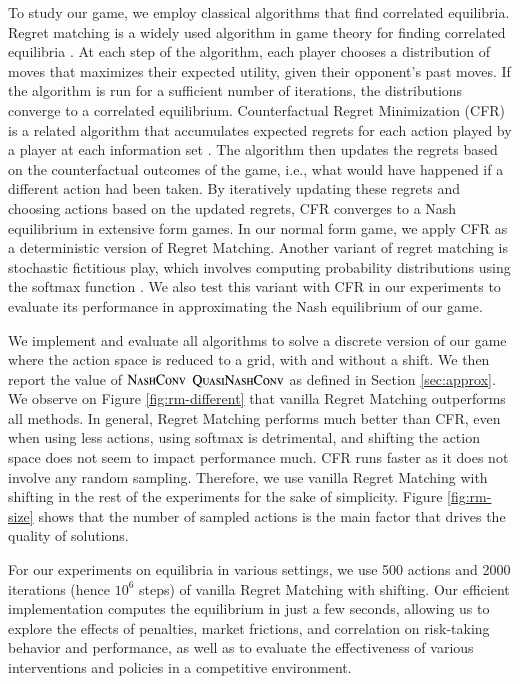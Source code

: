\documentclass[preprint,12pt,authoryear]{elsarticle}
\theoremstyle{definition}
\begin{document}
To study our game, we employ classical algorithms that find correlated equilibria. Regret matching is a widely used algorithm in game theory for finding correlated equilibria \citep{Hart1997-nk}. At each step of the algorithm, each player chooses a distribution of moves that maximizes their expected utility, given their opponent's past moves. If the algorithm is run for a sufficient number of iterations, the distributions converge to a correlated equilibrium. Counterfactual Regret Minimization (CFR) is a related algorithm that accumulates expected regrets for each action played by a player at each information set \citep{neller2013introduction}. The algorithm then updates the regrets based on the counterfactual outcomes of the game, i.e., what would have happened if a different action had been taken. By iteratively updating these regrets and choosing actions based on the updated regrets, CFR converges to a Nash equilibrium in extensive form games. In our normal form game, we apply CFR as a deterministic version of Regret Matching. Another variant of regret matching is stochastic fictitious play, which involves computing probability distributions using the softmax function \citep{fudenberg1993learning}. We also test this variant with CFR in our experiments to evaluate its performance in approximating the Nash equilibrium of our game.

We implement and evaluate all algorithms to solve a discrete version of our game where the action space is reduced to a grid, with and without a shift. We then report the value of $\textsc{NashConv}$ $\textsc{QuasiNashConv}$ as defined in Section \ref{sec:approx}. We observe on Figure \ref{fig:rm-different} that vanilla Regret Matching outperforms all methods. In general, Regret Matching performs much better than CFR, even when using less actions, using softmax is detrimental, and shifting the action space does not seem to impact performance much. CFR runs faster as it does not involve any random sampling. Therefore, we use vanilla Regret Matching with shifting in the rest of the experiments for the sake of simplicity. Figure \ref{fig:rm-size} shows that the number of sampled actions is the main factor that drives the quality of solutions.

For our experiments on equilibria in various settings, we use 500 actions and 2000 iterations (hence $10^6$ steps) of vanilla Regret Matching with shifting. Our efficient implementation computes the equilibrium in just a few seconds, allowing us to explore the effects of penalties, market frictions, and correlation on risk-taking behavior and performance, as well as to evaluate the effectiveness of various interventions and policies in a competitive environment.
\end{document}
